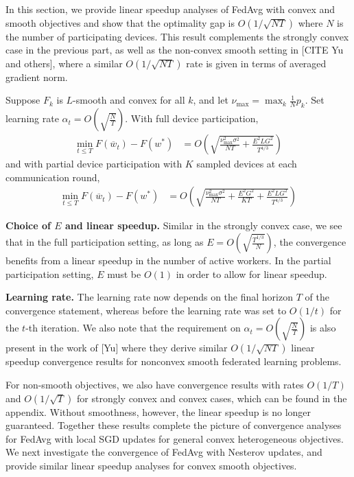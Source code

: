 In this section, we provide linear speedup analyses of FedAvg with
convex and smooth objectives and show that the optimality gap is $O(1/\sqrt{NT})$
where $N$ is the number of participating devices. This result complements
the strongly convex case in the previous part, as well as the non-convex
smooth setting in {[}CITE Yu and others{]}, where a similar $O(1/\sqrt{NT})$
rate is given in terms of averaged gradient norm. 
\begin{theorem}
	Suppose $F_{k}$ is $L$-smooth and convex for all $k$, and let $\nu_{\max}=\max_{k}\frac{1}{N}p_{k}$.
	Set learning rate $\alpha_{t}=O(\sqrt{\frac{N}{T}})$. With full device participation, 
	\begin{align*}
	\min_{t\leq T}F(\overline{w}_{t})-F(w^{\ast}) & =O(\sqrt{\frac{\nu_{\max}^{2}\sigma^{2}}{NT}+\frac{E^{2}LG^{2}}{T^{4/3}}})
	\end{align*}
	and with partial device participation with $K$ sampled devices at
	each communication round, 
	\begin{align*}
	\min_{t\leq T}F(\overline{w}_{t})-F(w^{\ast}) & =O(\sqrt{\frac{\nu_{\max}^{2}\sigma^{2}}{NT}+\frac{E^{2}G^{2}}{KT}+\frac{E^{2}LG^{2}}{T^{4/3}}})
	\end{align*}
\end{theorem}

\begin{remark}
	\textbf{Choice of $E$ and linear speedup. }Similar in the strongly
	convex case, we see that in the full participation setting, as long
	as $E=O(\sqrt{\frac{T^{1/3}}{N}})$, the convergence benefits from
	a linear speedup in the number of active workers. In the partial participation
	setting, $E$ must be $O(1)$ in order to allow for linear speedup.
\end{remark}
%
\begin{remark}
	\textbf{Learning rate. }The learning rate now depends on the final
	horizon $T$ of the convergence statement, whereas before the learning
	rate was set to $O(1/t)$ for the $t$-th iteration. We also note
	that the requirement on $\alpha_{t}=O(\sqrt{\frac{N}{T}})$ is also
	present in the work of {[}Yu{]} where they derive similar $O(1/\sqrt{NT})$
	linear speedup convergence results for nonconvex smooth federated
	learning problems.
\end{remark}
For non-smooth objectives, we also have convergence results with rates
$O(1/T)$ and $O(1/\sqrt{T})$ for strongly convex and convex cases,
which can be found in the appendix. Without smoothness, however, the
linear speedup is no longer guaranteed. Together these results complete
the picture of convergence analyses for FedAvg with local SGD updates
for general convex heterogeneous objectives. We next investigate the
convergence of FedAvg with Nesterov updates, and provide similar linear
speedup analyses for convex smooth objectives. 